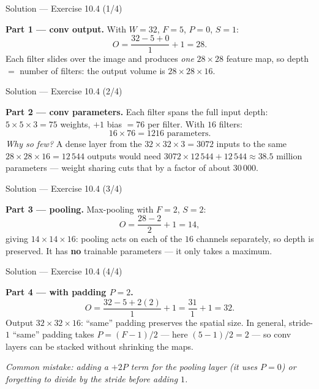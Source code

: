 \documentclass[aspectratio=169,11pt]{beamer}
\begin{document}
\begin{frame}{Solution --- Exercise 10.4 (1/4)}
\begin{solutionbox}
  \textbf{Part 1 --- conv output.} With $W = 32$, $F = 5$, $P = 0$,
  $S = 1$:
  \[
    O = \frac{32 - 5 + 0}{1} + 1 = 28 .
  \]
  Each filter slides over the image and produces \emph{one} $28 \times 28$
  feature map, so depth $=$ number of filters: the output volume is
  $28 \times 28 \times 16$.
\end{solutionbox}
\end{frame}

\begin{frame}{Solution --- Exercise 10.4 (2/4)}
\begin{solutionbox}
  \medskip
  \textbf{Part 2 --- conv parameters.} Each filter spans the full
  input depth: $5 \times 5 \times 3 = 75$ weights, $+1$ bias $= 76$
  per filter. With $16$ filters:
  \[
    16 \times 76 = \boxed{1216} \text{ parameters.}
  \]
  \emph{Why so few?} A dense layer from the $32 \times 32 \times 3 = 3072$
  inputs to the same $28 \times 28 \times 16 = 12\,544$ outputs would need
  $3072 \times 12\,544 + 12\,544 \approx 38.5$ million parameters --- weight
  sharing cuts that by a factor of about $30\,000$.
\end{solutionbox}
\end{frame}

\begin{frame}{Solution --- Exercise 10.4 (3/4)}
\begin{solutionbox}
  \textbf{Part 3 --- pooling.} Max-pooling with $F = 2$, $S = 2$:
  \[
    O = \frac{28 - 2}{2} + 1 = 14 ,
  \]
  giving $14 \times 14 \times 16$: pooling acts on each of the $16$ channels
  separately, so depth is preserved. It has \textbf{no} trainable
  parameters --- it only takes a maximum.
\end{solutionbox}
\end{frame}

\begin{frame}{Solution --- Exercise 10.4 (4/4)}
\begin{solutionbox}
  \medskip
  \textbf{Part 4 --- with padding $P = 2$.}
  \[
    O = \frac{32 - 5 + 2(2)}{1} + 1 = \frac{31}{1} + 1 = 32 .
  \]
  Output $32 \times 32 \times 16$: ``same'' padding preserves the
  spatial size. In general, stride-$1$ ``same'' padding takes
  $P = (F-1)/2$ --- here $(5-1)/2 = 2$ --- so conv layers can be stacked
  without shrinking the maps.

  \medskip
  \textit{Common mistake: adding a $+2P$ term for the pooling layer (it uses
  $P = 0$) or forgetting to divide by the stride \emph{before} adding $1$.}
\end{solutionbox}
\end{frame}
\end{document}
